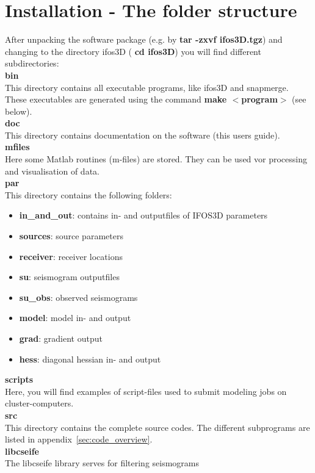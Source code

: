 \section{Installation - The folder structure}
After unpacking the software package (e.g. by  \textbf{tar -zxvf ifos3D.tgz}) and changing to the directory ifos3D ( \textbf{cd ifos3D})  you will find different subdirectories:\vspace{0.2cm}\\
\textbf{bin}\\
This directory contains all executable programs, like ifos3D and snapmerge. These executables are generated using the command  \textbf{make $<$program$>$} (see below).\vspace{0.2cm}\\
\textbf{doc}\\
This directory contains documentation on the software (this users guide). \vspace{0.2cm}\\ 
\textbf{mfiles}\\
Here some Matlab routines (m-files) are stored. They can be used vor processing and visualisation of data. \vspace{0.2cm}\\
\textbf{par}\\
This directory contains the following folders:
\begin{itemize}
 \item \textbf{in\_and\_out}: contains in- and outputfiles of IFOS3D parameters
 \item \textbf{sources}: source parameters
 \item \textbf{receiver}: receiver locations
 \item \textbf{su}: seismogram outputfiles
 \item \textbf{su\_obs}: observed seismograms
 \item \textbf{model}: model in- and output
 \item \textbf{grad}: gradient output
 \item \textbf{hess}: diagonal hessian in- and output
\end{itemize}\vspace{0.2cm}
\textbf{scripts}\\
Here, you will find examples of script-files used to submit modeling jobs on cluster-computers.\vspace{0.2cm}\\
\textbf{src}\\ 
This directory contains the complete source codes. The different subprograms are listed in appendix~\ref{sec:code_overview}.\vspace{0.2cm}\\
\textbf{libcseife}\\
The libcseife library serves for filtering seismograms
